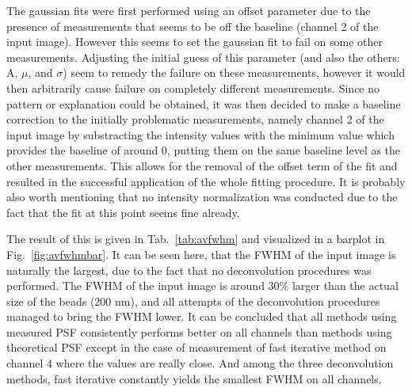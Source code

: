 The gaussian fits were first performed using an offset parameter due to the presence of measurements that seems to be off the baseline (channel 2 of the input image). 
However this seems to set the gaussian fit to fail on some other measurements. 
Adjusting the initial guess of this parameter (and also the others: A, $\mu$, and $\sigma$) seem to remedy the failure on these measurements, however it would then arbitrarily cause failure on completely different measurements. 
Since no pattern or explanation could be obtained, it was then decided to make a baseline correction to the initially problematic measurements, namely channel 2 of the input image by substracting the intensity values with the minimum value which provides the baseline of around 0, putting them on the same baseline level as the other measurements. 
This allows for the removal of the offset term of the fit and resulted in the successful application of the whole fitting procedure. 
It is probably also worth mentioning that no intensity normalization was conducted due to the fact that the fit at this point seems fine already.

The result of this is given in Tab.~\ref{tab:avfwhm} and visualized in a barplot in Fig.~\ref{fig:avfwhmbar}. 
It can be seen here, that the FWHM of the input image is naturally the largest, due to the fact that no deconvolution procedures was performed. 
The FWHM of the input image is around 30\% larger than the actual size of the beads (200 nm), and all attempts of the deconvolution procedures managed to bring the FWHM lower. 
It can be concluded that all methods using measured PSF consistently performs better on all channels than methods using theoretical PSF except in the case of measurement of fast iterative method on channel 4 where the values are really close. 
And among the three deconvolution methods, fast iterative constantly yields the smallest FWHM on all channels.

